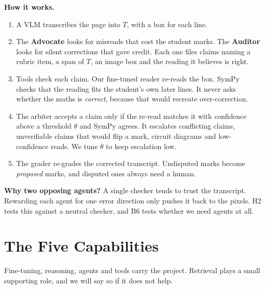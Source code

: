 \documentclass[11pt,a4paper]{article}
\begin{document}
\textbf{How it works.}
\begin{enumerate}
\item A VLM transcribes the page into $T$, with a box for each line.
\item The \textbf{Advocate} looks for misreads that cost the student marks. The \textbf{Auditor} looks for silent corrections that gave credit. Each one files claims naming a rubric item, a span of $T$, an image box and the reading it believes is right.
\item Tools check each claim. Our fine-tuned reader re-reads the box. SymPy checks that the reading fits the student's own later lines. It never asks whether the maths is \emph{correct}, because that would recreate over-correction.
\item The arbiter accepts a claim only if the re-read matches it with confidence above a threshold $\theta$ and SymPy agrees. It escalates conflicting claims, unverifiable claims that would flip a mark, circuit diagrams and low-confidence reads. We tune $\theta$ to keep escalation low.
\item The grader re-grades the corrected transcript. Undisputed marks become \emph{proposed} marks, and disputed ones always need a human.
\end{enumerate}

\textbf{Why two opposing agents?} A single checker tends to trust the transcript. Rewarding each agent for one error direction only pushes it back to the pixels. H2 tests this against a neutral checker, and B6 tests whether we need agents at all.

\section{The Five Capabilities}
Fine-tuning, reasoning, agents and tools carry the project. Retrieval plays a small supporting role, and we will say so if it does not help.
\end{document}
